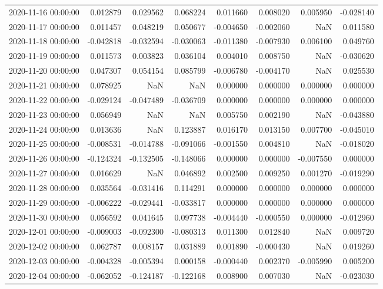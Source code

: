 \begin{tabular}{lrrrrrrr}
2020-11-16 00:00:00 & 0.012879 & 0.029562 & 0.068224 & 0.011660 & 0.008020 & 0.005950 & -0.028140 \\
2020-11-17 00:00:00 & 0.011457 & 0.048219 & 0.050677 & -0.004650 & -0.002060 & NaN & 0.011580 \\
2020-11-18 00:00:00 & -0.042818 & -0.032594 & -0.030063 & -0.011380 & -0.007930 & 0.006100 & 0.049760 \\
2020-11-19 00:00:00 & 0.011573 & 0.003823 & 0.036104 & 0.004010 & 0.008750 & NaN & -0.030620 \\
2020-11-20 00:00:00 & 0.047307 & 0.054154 & 0.085799 & -0.006780 & -0.004170 & NaN & 0.025530 \\
2020-11-21 00:00:00 & 0.078925 & NaN & NaN & 0.000000 & 0.000000 & 0.000000 & 0.000000 \\
2020-11-22 00:00:00 & -0.029124 & -0.047489 & -0.036709 & 0.000000 & 0.000000 & 0.000000 & 0.000000 \\
2020-11-23 00:00:00 & 0.056949 & NaN & NaN & 0.005750 & 0.002190 & NaN & -0.043880 \\
2020-11-24 00:00:00 & 0.013636 & NaN & 0.123887 & 0.016170 & 0.013150 & 0.007700 & -0.045010 \\
2020-11-25 00:00:00 & -0.008531 & -0.014788 & -0.091066 & -0.001550 & 0.004810 & NaN & -0.018020 \\
2020-11-26 00:00:00 & -0.124324 & -0.132505 & -0.148066 & 0.000000 & 0.000000 & -0.007550 & 0.000000 \\
2020-11-27 00:00:00 & 0.016629 & NaN & 0.046892 & 0.002500 & 0.009250 & 0.001270 & -0.019290 \\
2020-11-28 00:00:00 & 0.035564 & -0.031416 & 0.114291 & 0.000000 & 0.000000 & 0.000000 & 0.000000 \\
2020-11-29 00:00:00 & -0.006222 & -0.029441 & -0.033817 & 0.000000 & 0.000000 & 0.000000 & 0.000000 \\
2020-11-30 00:00:00 & 0.056592 & 0.041645 & 0.097738 & -0.004440 & -0.000550 & 0.000000 & -0.012960 \\
2020-12-01 00:00:00 & -0.009003 & -0.092300 & -0.080313 & 0.011300 & 0.012840 & NaN & 0.009720 \\
2020-12-02 00:00:00 & 0.062787 & 0.008157 & 0.031889 & 0.001890 & -0.000430 & NaN & 0.019260 \\
2020-12-03 00:00:00 & -0.004328 & -0.005394 & 0.000158 & -0.000440 & 0.002370 & -0.005990 & 0.005200 \\
2020-12-04 00:00:00 & -0.062052 & -0.124187 & -0.122168 & 0.008900 & 0.007030 & NaN & -0.023030 \\

\end{tabular}
